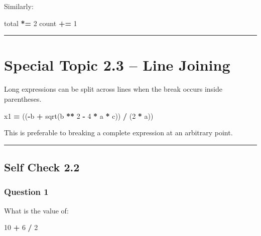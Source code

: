 \documentclass[
]{article}
\newenvironment{Shaded}{\begin{snugshade}}{\end{snugshade}}
\newcommand{\DecValTok}[1]{\textcolor[rgb]{0.00,0.00,0.81}{#1}}
\newcommand{\NormalTok}[1]{#1}
\newcommand{\OperatorTok}[1]{\textcolor[rgb]{0.81,0.36,0.00}{\textbf{#1}}}
\begin{document}
Similarly:

\begin{Shaded}
\begin{Highlighting}[]
\NormalTok{total }\OperatorTok{*=} \DecValTok{2}
\NormalTok{count }\OperatorTok{+=} \DecValTok{1}
\end{Highlighting}
\end{Shaded}

\begin{center}\rule{0.5\linewidth}{0.5pt}\end{center}

\section{Special Topic 2.3 -- Line
Joining}\label{special-topic-2.3-line-joining}

Long expressions can be split across lines when the break occurs inside
parentheses.

\begin{Shaded}
\begin{Highlighting}[]
\NormalTok{x1 }\OperatorTok{=}\NormalTok{ ((}\OperatorTok{{-}}\NormalTok{b }\OperatorTok{+}\NormalTok{ sqrt(b }\OperatorTok{**} \DecValTok{2} \OperatorTok{{-}} \DecValTok{4} \OperatorTok{*}\NormalTok{ a }\OperatorTok{*}\NormalTok{ c))}
      \OperatorTok{/}\NormalTok{ (}\DecValTok{2} \OperatorTok{*}\NormalTok{ a))}
\end{Highlighting}
\end{Shaded}

This is preferable to breaking a complete expression at an arbitrary
point.

\begin{center}\rule{0.5\linewidth}{0.5pt}\end{center}

\subsection{Self Check 2.2}\label{self-check-2.2}

\subsubsection{Question 1}\label{question-1-1}

What is the value of:

\begin{Shaded}
\begin{Highlighting}[]
\DecValTok{10} \OperatorTok{+} \DecValTok{6} \OperatorTok{/} \DecValTok{2}
\end{Highlighting}
\end{Shaded}
\end{document}
